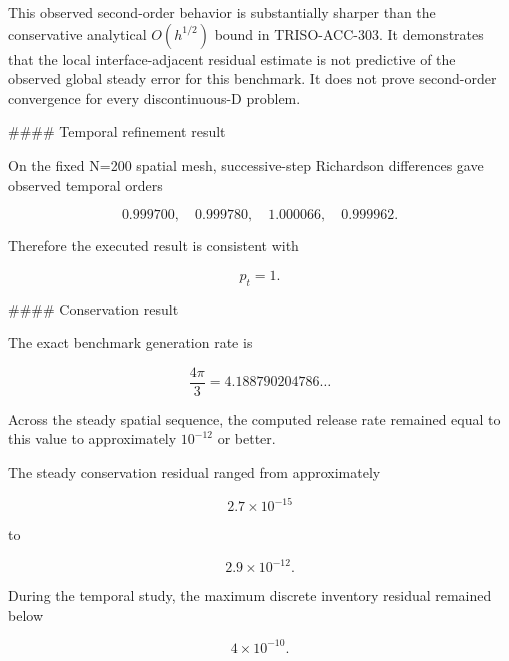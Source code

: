 \documentclass[11pt,a4paper]{article}
\begin{document}
This observed second-order behavior is substantially sharper than the conservative analytical $O(h^{1/2})$ bound in TRISO-ACC-303. It demonstrates that the local interface-adjacent residual estimate is not predictive of the observed global steady error for this benchmark. It does not prove second-order convergence for every discontinuous-D problem.

\#\#\#\# Temporal refinement result

On the fixed N=200 spatial mesh, successive-step Richardson differences gave observed temporal orders

\begin{equation}
0.999700,\quad0.999780,\quad1.000066,\quad0.999962.
\tag{TRISO-ACC-328}
\label{eq:triso-acc-328}
\end{equation}

Therefore the executed result is consistent with

\begin{equation}
\boxed{p_t=1.}
\tag{TRISO-ACC-329}
\label{eq:triso-acc-329}
\end{equation}

\#\#\#\# Conservation result

The exact benchmark generation rate is

\begin{equation}
\frac{4\pi}{3}=4.188790204786\ldots
\tag{TRISO-ACC-330}
\label{eq:triso-acc-330}
\end{equation}

Across the steady spatial sequence, the computed release rate remained equal to this value to approximately $10^{-12}$ or better.

The steady conservation residual ranged from approximately

\begin{equation}
2.7\times10^{-15}
\tag{TRISO-ACC-331}
\label{eq:triso-acc-331}
\end{equation}

to

\begin{equation}
2.9\times10^{-12}.
\tag{TRISO-ACC-332}
\label{eq:triso-acc-332}
\end{equation}

During the temporal study, the maximum discrete inventory residual remained below

\begin{equation}
\boxed{4\times10^{-10}.}
\tag{TRISO-ACC-333}
\label{eq:triso-acc-333}
\end{equation}
\end{document}
